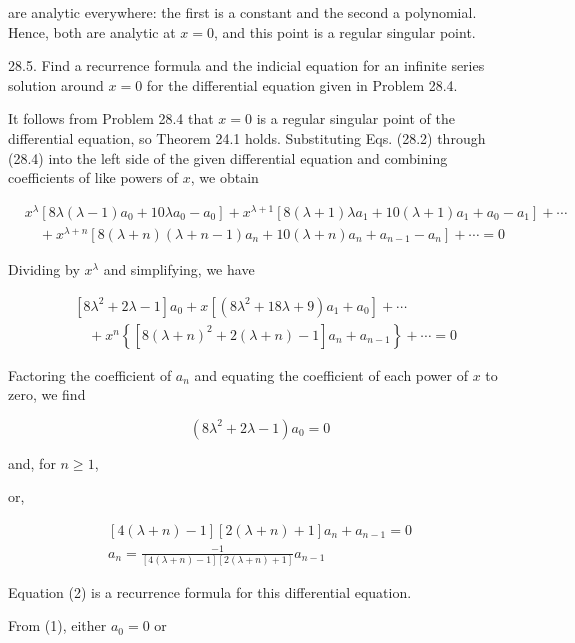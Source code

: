 \documentclass[10pt]{article}
\begin{document}
are analytic everywhere: the first is a constant and the second a polynomial. Hence, both are analytic at $x=0$, and this point is a regular singular point.

28.5. Find a recurrence formula and the indicial equation for an infinite series solution around $x=0$ for the differential equation given in Problem 28.4.

It follows from Problem 28.4 that $x=0$ is a regular singular point of the differential equation, so Theorem 24.1 holds. Substituting Eqs. (28.2) through (28.4) into the left side of the given differential equation and combining coefficients of like powers of $x$, we obtain

$$
\begin{aligned}
& x^{\lambda}\left[8 \lambda(\lambda-1) a_{0}+10 \lambda a_{0}-a_{0}\right]+x^{\lambda+1}\left[8(\lambda+1) \lambda a_{1}+10(\lambda+1) a_{1}+a_{0}-a_{1}\right]+\cdots \\
& \quad+x^{\lambda+n}\left[8(\lambda+n)(\lambda+n-1) a_{n}+10(\lambda+n) a_{n}+a_{n-1}-a_{n}\right]+\cdots=0
\end{aligned}
$$

Dividing by $x^{\lambda}$ and simplifying, we have

$$
\begin{aligned}
& {\left[8 \lambda^{2}+2 \lambda-1\right] a_{0}+x\left[\left(8 \lambda^{2}+18 \lambda+9\right) a_{1}+a_{0}\right]+\cdots} \\
& \quad+x^{n}\left\{\left[8(\lambda+n)^{2}+2(\lambda+n)-1\right] a_{n}+a_{n-1}\right\}+\cdots=0
\end{aligned}
$$

Factoring the coefficient of $a_{n}$ and equating the coefficient of each power of $x$ to zero, we find


\begin{equation*}
\left(8 \lambda^{2}+2 \lambda-1\right) a_{0}=0 \tag{1}
\end{equation*}


and, for $n \geq 1$,

or,


\begin{gather*}
{[4(\lambda+n)-1][2(\lambda+n)+1] a_{n}+a_{n-1}=0} \\
a_{n}=\frac{-1}{[4(\lambda+n)-1][2(\lambda+n)+1]} a_{n-1} \tag{2}
\end{gather*}


Equation (2) is a recurrence formula for this differential equation.

From (1), either $a_{0}=0$ or
\end{document}
